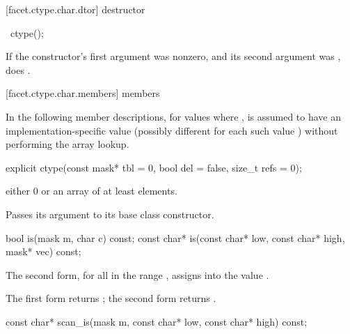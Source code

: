 [facet.ctype.char.dtor]{ destructor}

%
\begin{itemdecl}
~ctype();
\end{itemdecl}

\begin{itemdescr}
\pnum
\effects
If the constructor's first argument was nonzero, and its second argument
was , does
.
\end{itemdescr}

[facet.ctype.char.members]{ members}

\pnum
{}%
In the following member descriptions, for
values  where ,
 is assumed to have an
implementation-specific value (possibly different for each
such value ) without performing the array lookup.

%
\begin{itemdecl}
explicit ctype(const mask* tbl = 0, bool del = false,
               size_t refs = 0);
\end{itemdecl}

\begin{itemdescr}
\pnum
\requires
{} either 0 or an array of at least
elements.

\pnum
\effects
Passes its  argument to its base class constructor.
\end{itemdescr}

%
\begin{itemdecl}
bool        is(mask m, char c) const;
const char* is(const char* low, const char* high,
               mask* vec) const;
\end{itemdecl}

\begin{itemdescr}
\pnum
\effects
The second form, for all
in the range
,
assigns
into
the value
.

\pnum
\returns
The first form returns
;
the second form returns .
\end{itemdescr}

%
\begin{itemdecl}
const char* scan_is(mask m,
                    const char* low, const char* high) const;
\end{itemdecl}


